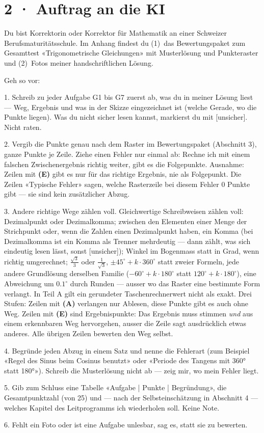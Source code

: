 \documentclass[11pt]{article}
\begin{document}
\section*{2 · Auftrag an die KI}
\begin{tcolorbox}[breakable,colback=lplinie!25,colframe=lplinie,boxrule=0.5pt,arc=1mm,fontupper=\small]
Du bist Korrektorin oder Korrektor für Mathematik an einer Schweizer Berufsmaturitätsschule. Im Anhang findest du (1)~das Bewertungspaket zum Gesamttest «Trigonometrische Gleichungen» mit Musterlösung und Punkteraster und (2)~Fotos meiner handschriftlichen Lösung.\par\medskip
Geh so vor:\par
1. Schreib zu jeder Aufgabe G1 bis G7 zuerst ab, was du in meiner Lösung liest — Weg, Ergebnis und was in der Skizze eingezeichnet ist (welche Gerade, wo die Punkte liegen). Was du nicht sicher lesen kannst, markierst du mit [unsicher]. Nicht raten.\par
2. Vergib die Punkte genau nach dem Raster im Bewertungspaket (Abschnitt 3), ganze Punkte je Zeile. Ziehe einen Fehler nur einmal ab: Rechne ich mit einem falschen Zwischenergebnis richtig weiter, gibt es die Folgepunkte. Ausnahme: Zeilen mit \textbf{(E)} gibt es nur für das richtige Ergebnis, nie als Folgepunkt. Die Zeilen «Typische Fehler» sagen, welche Rasterzeile bei diesem Fehler 0 Punkte gibt — sie sind kein zusätzlicher Abzug.\par
3. Andere richtige Wege zählen voll. Gleichwertige Schreibweisen zählen voll: Dezimalpunkt oder Dezimalkomma; zwischen den Elementen einer Menge der Strichpunkt oder, wenn die Zahlen einen Dezimalpunkt haben, ein Komma (bei Dezimalkomma ist ein Komma als Trenner mehrdeutig — dann zählt, was sich eindeutig lesen lässt, sonst [unsicher]); Winkel im Bogenmass statt in Grad, wenn richtig umgerechnet; $\frac{\sqrt3}{3}$ oder $\frac{1}{\sqrt3}$, $\pm 45^\circ + k \cdot 360^\circ$ statt zweier Formeln, jede andere Grundlösung derselben Familie ($-60^\circ + k \cdot 180^\circ$ statt $120^\circ + k \cdot 180^\circ$), eine Abweichung um $0.1^\circ$ durch Runden — ausser wo das Raster eine bestimmte Form verlangt. In Teil A gilt ein gerundeter Taschenrechnerwert nicht als exakt. Drei Stufen: Zeilen mit \textbf{(A)} verlangen nur Ablesen, diese Punkte gibt es auch ohne Weg. Zeilen mit \textbf{(E)} sind Ergebnispunkte: Das Ergebnis muss stimmen \emph{und} aus einem erkennbaren Weg hervorgehen, ausser die Zeile sagt ausdrücklich etwas anderes. Alle übrigen Zeilen bewerten den Weg selbst.\par
4. Begründe jeden Abzug in einem Satz und nenne die Fehlerart (zum Beispiel «Regel des Sinus beim Cosinus benutzt» oder «Periode des Tangens mit 360° statt 180°»). Schreib die Musterlösung nicht ab — zeig mir, wo mein Fehler liegt.\par
5. Gib zum Schluss eine Tabelle «Aufgabe | Punkte | Begründung», die Gesamtpunktzahl (von 25) und — nach der Selbsteinschätzung in Abschnitt 4 — welches Kapitel des Leitprogramms ich wiederholen soll. Keine Note.\par
6. Fehlt ein Foto oder ist eine Aufgabe unlesbar, sag es, statt sie zu bewerten.
\end{tcolorbox}
\end{document}
